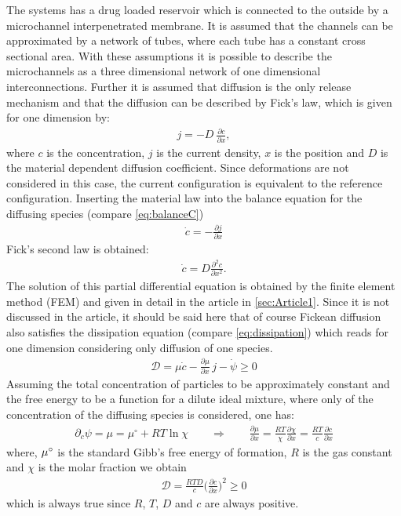The systems has a drug loaded reservoir which is connected to the outside by a microchannel interpenetrated membrane. It is assumed that the channels can be approximated by a network of tubes, where each tube has a constant cross sectional area. With these assumptions it is possible to describe the microchannels as a three dimensional network of one dimensional interconnections. Further it is assumed that diffusion is the only release mechanism and that the diffusion can be described by Fick's law, which is given for one dimension by: 
\begin{align}
  j = -D \ \frac{\partial c}{\partial x},
\end{align}
where $c$ is the concentration, $j$ is the current density, $x$ is the position and $D$ is the material dependent diffusion coefficient. Since deformations are not considered in this case, the current configuration is equivalent to the reference configuration. Inserting the material law into the balance equation for the diffusing species (compare \cref{eq:balanceC})
\begin{align}
  \dot c = - \frac{\partial j}{\partial x}
\end{align}
Fick's second law is obtained: 
\begin{align}
  \dot c = D \frac{\partial^2 c}{\partial x^2}.
\end{align}
The solution of this partial differential equation is obtained by the finite element method (FEM) and given in detail in the article in \cref{sec:Article1}. Since it is not discussed in the article, it should be said here that of course Fickean diffusion also satisfies the dissipation equation (compare \cref{eq:dissipation}) which reads for one dimension considering only diffusion of one species.
\begin{align}
  \mathcal{D} = \mu \dot c - \frac{\partial \mu}{\partial x} \, j - \dot \psi \geq 0
\end{align} 
Assuming the total concentration of particles to be approximately constant and the free energy to be a function for a dilute ideal mixture, where only of the concentration of the diffusing species is considered, one has:
\begin{align}
  \partial_c \psi = \mu = \mu^{\circ} + R T \ln{\chi} \qquad \Rightarrow \qquad \frac{\partial \mu}{\partial x} = \frac{R T}{\chi} \frac{\partial \chi}{\partial x} = \frac{RT}{c} \frac{\partial c}{\partial x}
\end{align}
where, $\mu^{\circ}$ is the standard Gibb's free energy of formation, $R$ is the gas constant and $\chi$ is the molar fraction we obtain
\begin{align}
  \mathcal{D} = \frac{RTD}{c} \bigg(\frac{\partial c}{\partial x}\bigg)^2 \geq 0
\end{align}
which is always true since $R$, $T$, $D$ and $c$ are always positive.

